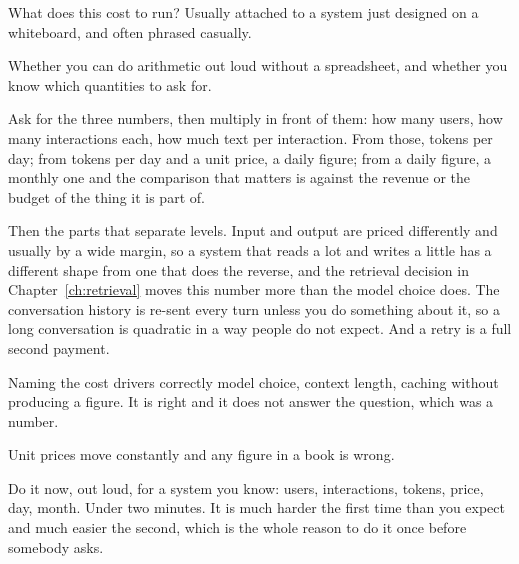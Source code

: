 \begin{bankq}{What does this cost to run?}
\qasked
Usually attached to a system just designed on a whiteboard, and often phrased
casually.

\qtested
Whether you can do arithmetic out loud without a spreadsheet, and whether you
know which quantities to ask for.

\qstaff
Ask for the three numbers, then multiply in front of them: how many users, how
many interactions each, how much text per interaction. From those, tokens per
day; from tokens per day and a unit price, a daily figure; from a daily figure,
a monthly one \dash{} and the comparison that matters is against the revenue or
the budget of the thing it is part of.


Then the parts that separate levels. Input and output are priced differently
and usually by a wide margin, so a system that reads a lot and writes a little
has a different shape from one that does the reverse, and the retrieval
decision in Chapter~\ref{ch:retrieval} moves this number more than the model
choice does. The conversation history is re-sent every turn unless you do
something about it, so a long conversation is quadratic in a way people do not
expect. And a retry is a full second payment.


\qsenior
Naming the cost drivers correctly \dash{} model choice, context length,
caching \dash{} without producing a figure. It is right and it does not answer
the question, which was a number.

\qcontested
Unit prices move constantly and any figure in a book is wrong. 

\qdrill
Do it now, out loud, for a system you know: users, interactions, tokens, price,
day, month. Under two minutes. It is much harder the first time than you expect
and much easier the second, which is the whole reason to do it once before
somebody asks.
\end{bankq}

